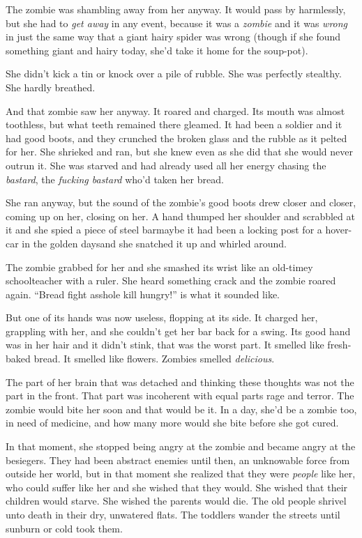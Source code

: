 The zombie was shambling away from her anyway. It would pass by
harmlessly, but she had to \emph{get away} in any event, because it
was a \emph{zombie} and it was \emph{wrong} in just the same way
that a giant hairy spider was wrong (though if she found something
giant and hairy today, she’d take it home for the soup-pot).

She didn’t kick a tin or knock over a pile of rubble. She was
perfectly stealthy. She hardly breathed.

And that zombie saw her anyway. It roared and charged. Its mouth
was almost toothless, but what teeth remained there gleamed. It had
been a soldier and it had good boots, and they crunched the broken
glass and the rubble as it pelted for her. She shrieked and ran,
but she knew even as she did that she would never outrun it. She
was starved and had already used all her energy chasing the
\emph{bastard}, the \emph{fucking bastard} who’d taken her bread.

She ran anyway, but the sound of the zombie’s good boots drew
closer and closer, coming up on her, closing on her. A hand thumped
her shoulder and scrabbled at it and she spied a piece of steel
bar\dash{}maybe it had been a locking post for a hover-car in the golden
days\dash{}and she snatched it up and whirled around.

The zombie grabbed for her and she smashed its wrist like an
old-timey schoolteacher with a ruler. She heard something crack and
the zombie roared again. “Bread fight asshole kill hungry!” is what
it sounded like.

But one of its hands was now useless, flopping at its side. It
charged her, grappling with her, and she couldn’t get her bar back
for a swing. Its good hand was in her hair and it didn’t stink,
that was the worst part. It smelled like fresh-baked bread. It
smelled like flowers. Zombies smelled \emph{delicious}.

The part of her brain that was detached and thinking these thoughts
was not the part in the front. That part was incoherent with equal
parts rage and terror. The zombie would bite her soon and that
would be it. In a day, she’d be a zombie too, in need of medicine,
and how many more would she bite before she got cured.

In that moment, she stopped being angry at the zombie and became
angry at the besiegers. They had been abstract enemies until then,
an unknowable force from outside her world, but in that moment she
realized that they were \emph{people} like her, who could suffer
like her and she wished that they would. She wished that their
children would starve. She wished the parents would die. The old
people shrivel unto death in their dry, unwatered flats. The
toddlers wander the streets until sunburn or cold took them.

